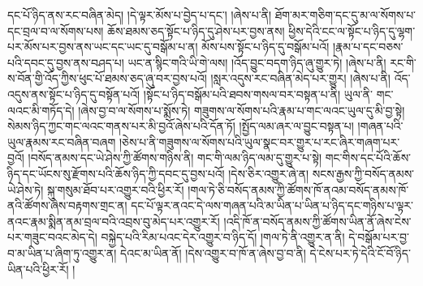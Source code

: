 དང་པོ་ཉིད་ནས་རང་བཞིན་མེད། །དེ་ལྟར་མོས་པ་བྱེད་པ་དང་། །ཞེས་པ་ནི། ཐོག་མར་གཅིག་དང་དུ་མ་ལ་སོགས་པ་དང་བྲལ་བ་ལ་སོགས་པས། ཆོས་ཐམས་ཅད་སྟོང་པ་ཉིད་དུ་ཤེས་པར་བྱས་ནས། ཕྱིས་དེའི་ངང་ལ་སྟོང་པ་ཉིད་དུ་ལྷག་པར་མོས་པར་བྱས་ནས་ཡང་དང་ཡང་དུ་བསྒོམ་པ་ན། མོས་པས་སྟོང་པ་ཉིད་དུ་བསྒོམ་པའོ། །རྣམ་པ་དང་བཅས་པའི་དབང་དུ་བྱས་ནས་བཤད་པ། ཡང་ན་སྙིང་གའི་ཡི་གེ་ལས། །འོད་བྱུང་བདག་ཉིད་ཞུ་གྱུར་ཏེ། །ཞེས་པ་ནི། རང་གི་ས་བོན་གྱི་འོད་ཀྱིས་ཕུང་པོ་ཐམས་ཅད་ཞུ་བར་བྱས་པའོ། །སླར་འདུས་རང་བཞིན་མེད་པར་གྱུར། །ཞེས་པ་ནི། འོད་འདུས་ནས་སྟོང་པ་ཉིད་དུ་བསྟོན་པའོ། །སྟོང་པ་ཉིད་བསྒོམ་པའི་ཐབས་གསལ་བར་བསྟན་པ་ནི། ཡུལ་ནི་​ གང་ལའང་མི་གཏོད་དེ། །ཞེས་བྱ་བ་ལ་སོགས་པ་སྨོས་ཏེ། གཟུགས་ལ་སོགས་པའི་རྣམ་པ་གང་ལའང་ཡུལ་དུ་མི་བྱ་སྟེ། སེམས་ཉིད་ཀྱང་གང་ལའང་གནས་པར་མི་བྱའོ་ཞེས་པའི་དོན་ཏོ། །སྤྱོད་ལམ་ཞར་ལ་བྱུང་བསྟན་པ། །གཞན་པའི་ཡུལ་རྣམས་རང་བཞིན་བཞག །ཅེས་པ་ནི་གཟུགས་ལ་སོགས་པའི་ཡུལ་སྣང་བར་གྱུར་པ་རང་ཞིར་གཞག་པར་བྱའོ། །བསོད་ནམས་དང་ཡེ་ཤེས་ཀྱི་ཚོགས་གཉིས་ནི། གང་གི་ལམ་ཉིད་ལམ་དུ་གྱུར་པ་སྟེ། གང་གིས་དང་པོའི་ཆོས་ཉིད་དང་ཡོངས་སུ་རྫོགས་པའི་ཆོས་ཉིད་ཀྱི་དབང་དུ་བྱས་པའོ། །དེས་ཅིར་འགྱུར་ཞེ་ན། སངས་རྒྱས་ཀྱི་བསོད་ནམས་ཡེ་ཤེས་ཏེ། སྐུ་གསུམ་ཐོབ་པར་འགྱུར་བའི་ཕྱིར་རོ། །གལ་ཏེ་ཅི་བསོད་ནམས་ཀྱི་ཚོགས་ཁོ་ནའམ་བསོད་ནམས་ཁོ་ནའི་ཚོགས་ཞེས་བརྟགས་གྲང་ན། དང་པོ་ལྟར་ནའང་དེ་ལས་གཞན་པའི་མ་ཡིན་པ་ཡིན་པ་ཉིད་དང་གཉིས་པ་ལྟར་ནའང་རྣམ་སྨིན་ནམ་བྲལ་བའི་འབྲས་བུ་མེད་པར་འགྱུར་རོ། །འདི་ཁོ་ན་བསོད་ནམས་ཀྱི་ཚོགས་ཡིན་ནོ་ཞེས་ངེས་པར་གཟུང་བའང་མེད་དེ། བསྐྱེད་པའི་རིམ་པའང་དེར་འགྱུར་བ་ཉིད་དོ། །གལ་ཏེ་ནི་འགྱུར་ན་ནི། དེ་བསྒོམ་པར་བྱ་བ་མ་ཡིན་པ་ཞིག་ཏུ་འགྱུར་ན། དེའང་མ་ཡིན་ནོ། །དེས་འགྱུར་བ་ཁོ་ན་ཞེས་བྱ་བ་ནི། དེ་ངེས་པར་ཏེ་དེའི་ངོ་བོ་ཉིད་ཡིན་པའི་ཕྱིར་རོ། །
